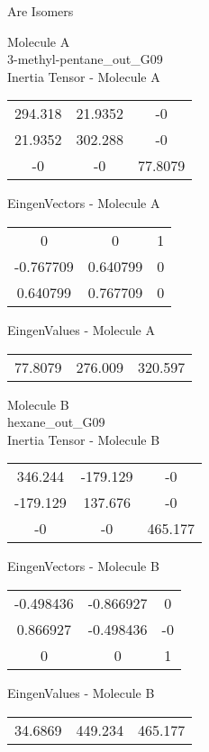 \begin{center}
\vtab
\vtab
\textcolor{NavyBlue}{\Large Are Isomers}
\end{center}
\newpage
\begin{multicols}{2}
\begin{center}
Molecule A \\ 
3-methyl-pentane\_out\_G09
\\
Inertia Tensor - Molecule A \\
\vtab
\begin{tabular}{|c c c|}
294.318	 & 	21.9352	 & 	-0	 \\
21.9352	 & 	302.288	 & 	-0	 \\
-0	 & 	-0	 & 	77.8079
\end{tabular}

\vtab
 EingenVectors - Molecule A     \\
\vtab
\begin{tabular}{|c c c|}
0	 & 	0	 & 	1	 \\
-0.767709	 & 	0.640799	 & 	0	 \\
0.640799	 & 	0.767709	 & 	0
\end{tabular}

\vtab
 EingenValues - Molecule A     \\
\vtab
\begin{tabular}{|c c c|}
77.8079	 & 	276.009	 & 	320.597
\end{tabular}
\columnbreak

Molecule B \\ 
hexane\_out\_G09
\\
Inertia Tensor - Molecule B \\
\vtab
\begin{tabular}{|c c c|}
346.244	 & 	-179.129	 & 	-0	 \\
-179.129	 & 	137.676	 & 	-0	 \\
-0	 & 	-0	 & 	465.177
\end{tabular}

\vtab
 EingenVectors - Molecule B     \\
\vtab
\begin{tabular}{|c c c|}
-0.498436	 & 	-0.866927	 & 	0	 \\
0.866927	 & 	-0.498436	 & 	-0	 \\
0	 & 	0	 & 	1
\end{tabular}

\vtab
 EingenValues - Molecule B     \\
\vtab
\begin{tabular}{|c c c|}
34.6869	 & 	449.234	 & 	465.177
\end{tabular}

\end{center}
\end{multicols}
